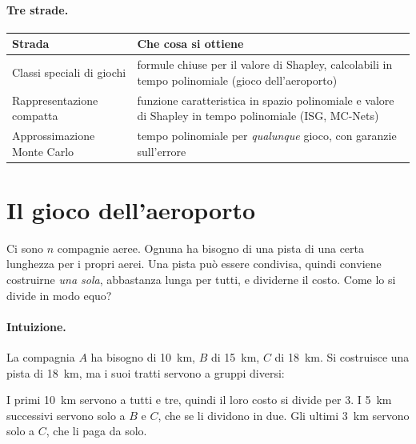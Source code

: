 \paragraph{Tre strade.}
\begin{center}
\renewcommand{\arraystretch}{1.3}
\begin{tabularx}{\linewidth}{@{}l X@{}}
\toprule
\textbf{Strada} & \textbf{Che cosa si ottiene} \\
\midrule
Classi speciali di giochi & formule chiuse per il valore di Shapley, calcolabili in tempo
  polinomiale (gioco dell'aeroporto) \\
Rappresentazione compatta & funzione caratteristica in spazio polinomiale e valore di
  Shapley in tempo polinomiale (ISG, MC-Nets) \\
Approssimazione Monte Carlo & tempo polinomiale per \emph{qualunque} gioco, con garanzie
  sull'errore \\
\bottomrule
\end{tabularx}
\end{center}

\section{Il gioco dell'aeroporto}
\label{sec:aeroporto}

Ci sono $n$ compagnie aeree. Ognuna ha bisogno di una pista di una certa lunghezza per i
propri aerei. Una pista può essere condivisa, quindi conviene costruirne \emph{una sola},
abbastanza lunga per tutti, e dividerne il costo. Come lo si divide in modo equo?

\paragraph{Intuizione.}
La compagnia $A$ ha bisogno di 10~km, $B$ di 15~km, $C$ di 18~km. Si costruisce una pista
di 18~km, ma i suoi tratti servono a gruppi diversi:
\begin{center}
\end{center}
I primi 10~km servono a tutti e tre, quindi il loro costo si divide per 3. I 5~km
successivi servono solo a $B$ e $C$, che se li dividono in due. Gli ultimi 3~km servono
solo a $C$, che li paga da solo.

